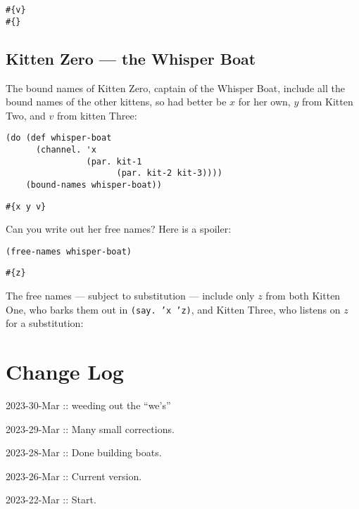 \documentclass[10pt,oneside,x11names]{article}
\theoremstyle{definition}
\theoremstyle{warning}
\begin{document}
\begin{verbatim}
#{v}
#{}
\end{verbatim}

\subsection{Kitten Zero --- the Whisper Boat}
\label{sec:orgf6e5963}

The bound names of Kitten Zero, captain of the Whisper Boat,
include all the bound names of the other kittens, so had better be
\(x\) for her own, \(y\) from Kitten Two, and \(v\) from kitten Three:

\vskip 0.26cm
\begin{verbatim}
(do (def whisper-boat
      (channel. 'x
                (par. kit-1
                      (par. kit-2 kit-3))))
    (bound-names whisper-boat))
\end{verbatim}

\begin{verbatim}
#{x y v}
\end{verbatim}


Can you write out her free names? Here is a spoiler:

\vskip 0.26cm
\begin{verbatim}
(free-names whisper-boat)
\end{verbatim}

\begin{verbatim}
#{z}
\end{verbatim}


The free names --- subject to substitution --- include only \(z\)
from both Kitten One, who barks them out in \texttt{(say. 'x 'z)}, and
Kitten Three, who listens on \(z\) for a substitution:

\section{Change Log}
\label{sec:orgbf89899}

2023-30-Mar :: weeding out the ``we's''

2023-29-Mar :: Many small corrections.

2023-28-Mar :: Done building boats.

2023-26-Mar :: Current version.

2023-22-Mar :: Start.
\end{document}
